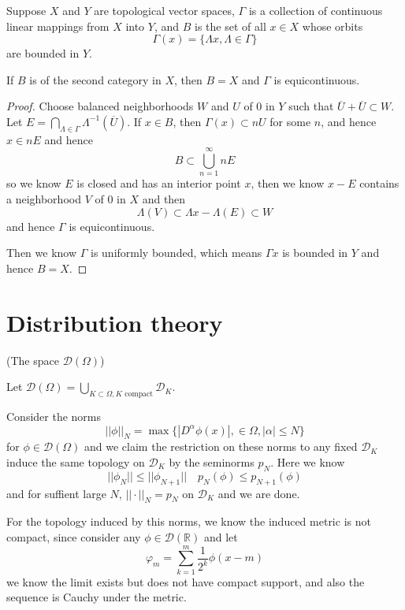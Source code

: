 \documentclass[lang=en, color=blue, ]{elegantbook}
\newcommand{\R}{\mathbb{R}}
\newcommand{\D}{\mathscr{D}}
\begin{document}
\begin{theorem}
    Suppose $X$ and $Y$ are topological vector spaces, $\Gamma$ is a collection of continuous linear mappings from $X$ into $Y$, and $B$ is the set of all $x\in X$ whose orbits \[\Gamma(x) = \{\Lambda x, \Lambda \in \Gamma\}\]are bounded in $Y$.\par
    If $B$ is of the second category in $X$, then $B = X$ and $\Gamma$ is equicontinuous.
\end{theorem}
\begin{proof}
    Choose balanced neighborhoods $W$ and $U$ of $0$ in $Y$ such that $\overline{U}+\overline{U} \subset W$. Let $E = \bigcap_{\Lambda \in \Gamma}\Lambda^{-1}(\overline{U})$. If $x\in B$, then $\Gamma(x) \subset nU$ for some $n$, and hence $x\in nE$ and hence
    \[
    B \subset \bigcup_{n=1}^{\infty} nE
    \]
    so we know $E$ is closed and has an interior point $x$, then we know $x - E$ contains a neighborhood $V$ of $0$ in $X$ and then
    \[\Lambda (V) \subset \Lambda x - \Lambda(E) \subset W
    \]
    and hence $\Gamma$ is equicontinuous.\par
    Then we know $\Gamma$ is uniformly bounded, which means $\Gamma x$ is bounded in $Y$ and hence $B = X$.
\end{proof}

\chapter{Distribution theory}

\begin{definition}
    (The space $\D(\Omega)$)\par
    Let $\D(\Omega) = \bigcup_{K\subset \Omega, K\text{ compact}}\D_K$.\par
\end{definition}
Consider the norms
\[||\phi||_N = \max\{|D^{\alpha}\phi(x)|, \in \Omega,|\alpha| \leq N\}\]
for $\phi \in \D(\Omega)$ and we claim the restriction on these norms to any fixed $\D_K$ induce the same topology on $\D_K$ by the seminorms $p_N$. Here we know
\[
||\phi_N|| \leq ||\phi_{N+1}||\quad p_N(\phi) \leq p_{N+1}(\phi)
\]
and for suffient large $N$, $||\cdot||_N = p_N$ on $\D_K$ and we are done.\par
For the topology induced by this norms, we know the induced metric is not compact, since consider any $\phi \in \D(\R)$ and let
\[
\varphi_m = \sum_{k=1}^m \dfrac{1}{2^k}\phi(x-m)
\]
we know the limit exists but does not have compact support, and also the sequence is Cauchy under the metric.
\end{document}
